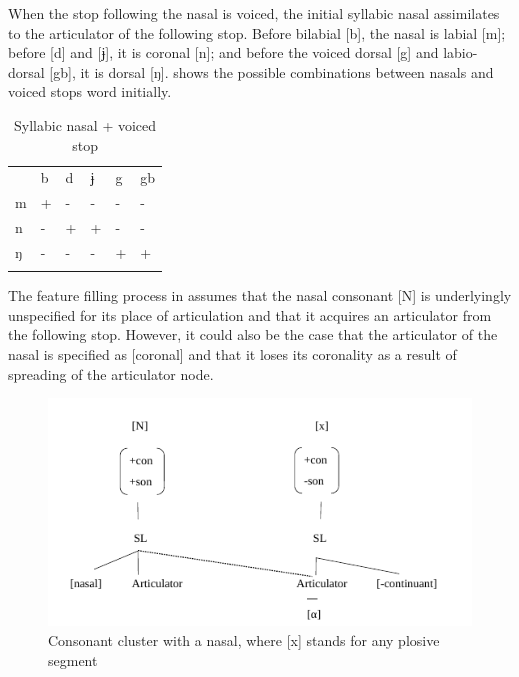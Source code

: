 \documentclass[output=paper]{langscibook}
\begin{document}
When the stop following the nasal is voiced, the initial syllabic nasal assimilates to the articulator of the following stop. Before bilabial [b], the nasal is labial [m]; before [d] and [ɉ], it is coronal [n]; and before the voiced dorsal [g] and labio-dorsal [gb], it is dorsal [ŋ].  shows the possible combinations between nasals and voiced stops word initially. 

\begin{table}[]
    \centering
\begin{tabularx}{.7\textwidth}{XXXXXX} & b & d & ɉ & g & gb\\
\lsptoprule
m & + & {}- & {}- & {}- & {}-\\
n & {}- & + & + & {}- & {}-\\
ŋ & {}- & {}- & {}- & + & +\\
\lspbottomrule
\end{tabularx}
    \caption{Syllabic nasal + voiced stop \label{tab:traore:syllabicNasalVoicedStop:5}}
    \label{tab:my_label}
\end{table}

The feature filling process in  assumes that the nasal consonant [N] is underlyingly unspecified for its place of articulation and that it acquires an articulator from the following stop. However, it could also be the case that the articulator of the nasal is specified as [coronal] and that it loses its coronality as a result of spreading of the articulator node.

    \begin{figure}
        \centering
    \includegraphics[width=.9\textwidth]{figures/featureAssignmentProcess2.png}
        \caption{Consonant cluster with a nasal, where [x] stands for any plosive segment \label{ex:traore:consonantClusterFeatureFillingProcess:19}}
    \end{figure}
\end{document}
